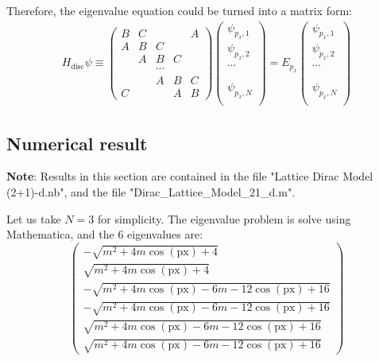 \documentclass{article}
\begin{document}
Therefore, the eigenvalue equation could be turned into a matrix form:
\begin{align}
    H_{\text{disc}} \psi \equiv 
    \begin{pmatrix}
        B   & C &        &   & A \\
        A   & B & C      &   & \\
            & A & B      & C & \\
            &   & \cdots &   & \\
            &   & A      & B & C \\
        C   &   &        & A & B
    \end{pmatrix}
    \begin{pmatrix}
        \psi_{p_x,1} \\
        \psi_{p_x,2} \\
        \cdots \\
        \\
        \\
        \psi_{p_x,N} \\
    \end{pmatrix} =
    E_{p_x}
    \begin{pmatrix}
        \psi_{p_x,1} \\
        \psi_{p_x,2} \\
        \cdots \\
        \\
        \\
        \psi_{p_x,N} \\
    \end{pmatrix}
\end{align}

    \subsection{Numerical result}
    \label{sec:Numerical result}
    \textbf{Note}: Results in this section are contained in the file
    "Lattice Dirac Model (2+1)-d.nb", and the file
    "Dirac\_Lattice\_Model\_21\_d.m".

    Let us take $N=3$ for simplicity. The eigenvalue problem is solve
    using Mathematica, and the $6$ eigenvalues are:
    \begin{equation}
        \begin{pmatrix}
        -\sqrt{m^2+4 m \cos (\text{px})+4}\\
        \sqrt{m^2+4 m \cos (\text{px})+4}\\
        -\sqrt{m^2+4 m \cos (\text{px})-6 m-12 \cos (\text{px})+16}\\
        -\sqrt{m^2+4 m \cos (\text{px})-6 m-12 \cos (\text{px})+16}\\
        \sqrt{m^2+4 m \cos (\text{px})-6 m-12 \cos (\text{px})+16}\\
        \sqrt{m^2+4 m \cos (\text{px})-6 m-12 \cos (\text{px})+16}
        \end{pmatrix}
    \end{equation}
\end{document}
